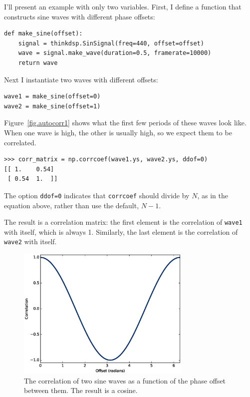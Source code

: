 \documentclass[12pt]{book}
\begin{document}
I'll present an example with only two variables.  First, I define
a function that constructs sine waves with different phase offsets:

\begin{verbatim}
def make_sine(offset):
    signal = thinkdsp.SinSignal(freq=440, offset=offset)
    wave = signal.make_wave(duration=0.5, framerate=10000)
    return wave
\end{verbatim}

Next I instantiate two waves with different offsets:

\begin{verbatim}
wave1 = make_sine(offset=0)
wave2 = make_sine(offset=1)
\end{verbatim}

Figure~\ref{fig.autocorr1} shows what the first few periods of these
waves look like.  When one wave is high, the other is usually high, so we
expect them to be correlated.

\begin{verbatim}
>>> corr_matrix = np.corrcoef(wave1.ys, wave2.ys, ddof=0)
[[ 1.    0.54]
 [ 0.54  1.  ]]
\end{verbatim}

The option {\tt ddof=0} indicates that {\tt corrcoef} should divide by
$N$, as in the equation above, rather than use the default, $N-1$.

The result is a correlation matrix:
the first element is the correlation of {\tt wave1}
with itself, which is always 1.  Similarly, the last element
is the correlation of {\tt wave2} with itself.

\begin{figure}
\centerline{\includegraphics[height=2.5in]{figs/autocorr2.eps}}
\caption{The correlation of two sine waves as a function of the
phase offset between them.  The result is a cosine.}
\label{fig.autocorr2}
\end{figure}
\end{document}
